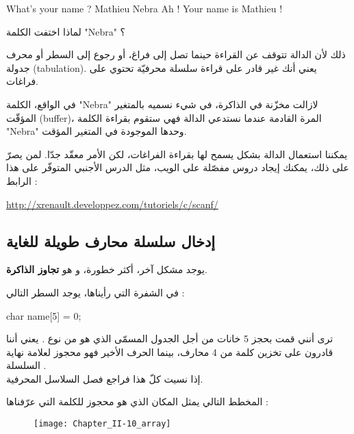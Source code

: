 \begin{Console}
What's your name ? Mathieu Nebra
Ah ! Your name is Mathieu !
\end{Console}

\begin{question}
لماذا اختفت الكلمة
"\textenglish{Nebra}"
؟
\end{question}

ذلك لأن الدالة
تتوقف عن القراءة حينما تصل إلى فراغ، أو رجوع إلى السطر أو محرف جدولة
(\textenglish{tabulation}).
يعني أنك غير قادر على قراءة سلسلة محرفيّة تحتوي على فراغات.

\begin{information}
  في الواقع، الكلمة
  "\textenglish{Nebra}"
  لازالت مخزّنة في الذاكرة، في  شيء نسميه بالمتغير المؤقّت
  (\textenglish{buffer})،
  المرة القادمة عندما نستدعي الدالة
  فهي ستقوم بقراءة الكلمة
  "\textenglish{Nebra}"
    وحدها الموجودة في المتغير المؤقت.
\end{information}

يمكننا استعمال الدالة
بشكل يسمح لها بقراءة الفراغات، لكن الأمر معقّد جدّا. لمن يصرّ على ذلك، يمكنك إيجاد دروس مفصّلة على الويب، مثل الدرس الأجنبي المتوفّر على هذا الرابط :

\url{http://xrenault.developpez.com/tutoriels/c/scanf/}

\subsection{إدخال سلسلة محارف طويلة للغاية}

يوجد مشكل آخر، أكثر خطورة، و هو
\textbf{تجاوز الذاكرة}.

في الشفرة التي رأيناها، يوجد السطر التالي :

\begin{Csource}
char name[5] = {0};
\end{Csource}

ترى أنني قمت بحجز 5 خانات من أجل الجدول المسمّى
الذي هو من نوع
.
يعني أننا قادرون على تخزين كلمة من 4 محارف، بينما الحرف الأخير فهو محجوز لعلامة نهاية السلسلة
.\\
إذا نسيت كلّ هذا فراجع فصل السلاسل المحرفية.

المخطط التالي يمثل المكان الذي هو محجوز للكلمة التي عرّفناها :

\begin{figure}[H]
	\centering
	\texttt{[image: Chapter\_II-10\_array]}
\end{figure}

